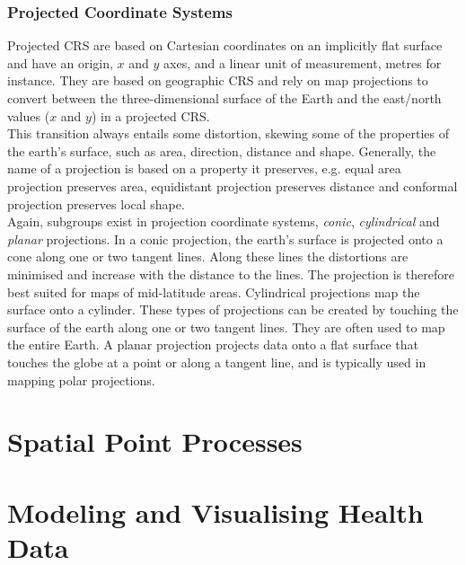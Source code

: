\documentclass[12pt]{book}
\begin{document}
\subsubsection*{Projected Coordinate Systems}
Projected CRS are based on Cartesian coordinates on an implicitly flat surface and have an origin, $x$ and $y$ axes, and a linear unit of measurement, metres for instance. They are based on geographic CRS and rely on map projections to convert between the three-dimensional surface of the Earth and the east/north values ($x$ and $y$) in a projected CRS.\\
This transition always entails some distortion, skewing some of the properties of the earth's surface, such as area, direction, distance and shape. Generally, the name of a projection is based on a property it preserves, e.g. equal area projection preserves area, equidistant projection preserves distance and conformal projection preserves local shape. \\
Again, subgroups exist in projection coordinate systems, \textit{conic}, \textit{cylindrical} and \textit{planar} projections. In a conic projection, the earth's surface is projected onto a cone along one or two tangent lines. Along these lines the distortions are minimised and increase with the distance to the lines. The projection is therefore best suited for maps of mid-latitude areas. Cylindrical projections map the surface onto a cylinder. These types of projections can be created by touching the surface of the earth along one or two tangent lines. They are often used to map the entire Earth. A planar projection projects data onto a flat surface that touches the globe at a point or along a tangent line, and is typically used in mapping polar projections\autocite[Cf.][]{lovelace2019geocomputation}.
\clearpage
\section{Spatial Point Processes}
\clearpage
\section{Modeling and Visualising Health Data}
\end{document}
